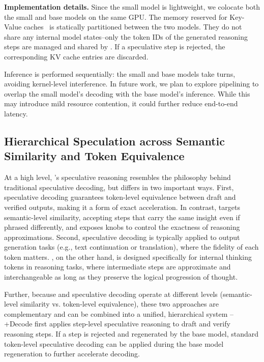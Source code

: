 \textbf{Implementation details.} Since the small model is lightweight, we colocate both the small and base models on the same GPU. The memory reserved for Key-Value caches~\citep{vllm} is statically partitioned between the two models. They do not share any internal model states--only the token IDs of the generated reasoning steps are managed and shared by \name{}. If a speculative step is rejected, the corresponding KV cache entries are discarded. 

Inference is performed sequentially: the small and base models take turns, avoiding kernel-level interference. In future work, we plan to explore pipelining to overlap the small model’s decoding with the base model’s inference. While this may introduce mild resource contention, it could further reduce end-to-end latency.








\subsection{Hierarchical Speculation across Semantic Similarity and Token Equivalence}
\label{sec:hierarchical_speculation}


At a high level, \name{}'s speculative reasoning resembles the philosophy behind traditional speculative decoding, but differs in two important ways. First, speculative decoding guarantees token-level equivalence between draft and verified outputs, making it a form of exact acceleration. In contrast, \name{} targets semantic-level similarity, accepting steps that carry the same insight even if phrased differently, and exposes knobs to control the exactness of reasoning approximations. Second, speculative decoding is typically applied to output generation tasks (e.g., text continuation or translation), where the fidelity of each token matters. \name{}, on the other hand, is designed specifically for internal thinking tokens in reasoning tasks, where intermediate steps are approximate and interchangeable as long as they preserve the logical progression of thought.




Further, because \name{} and speculative decoding operate at different levels (semantic-level similarity vs. token-level equivalence), these two approaches are complementary and can be combined into a unified, hierarchical system -- \name{}+Decode first applies step-level speculative reasoning to draft and verify reasoning steps. If a step is rejected and regenerated by the base model, standard token-level speculative decoding can be applied during the base model regeneration to further accelerate decoding. %







